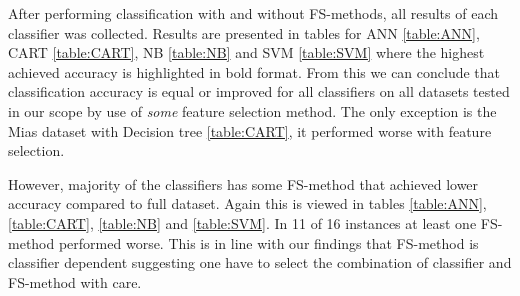After performing classification with and without FS-methods, all results of each classifier was collected. Results are presented in tables for ANN \ref{table:ANN}, CART \ref{table:CART}, NB \ref{table:NB} and SVM \ref{table:SVM} where the highest achieved accuracy is highlighted in bold format. From this we can conclude that classification accuracy is equal or improved for all classifiers on all datasets tested in our scope by use of \textit{some} feature selection method. The only exception is the Mias dataset with Decision tree \ref{table:CART}, it performed worse with feature selection.

However, majority of the classifiers has some FS-method that achieved lower accuracy compared to full dataset. Again this is viewed in tables \ref{table:ANN}, \ref{table:CART}, \ref{table:NB} and \ref{table:SVM}. In 11 of 16 instances at least one FS-method performed worse. This is in line with our findings that FS-method is classifier dependent suggesting one have to select the combination of classifier and FS-method with care.

\begin{table}[h]
  \centering
  
  \caption[]%
  {{\small Classification accuracy achieved by ANN. Accuracy improved on all datasets by the use of some feature selection method. Rows represent feature selection method, columns represent dataset, bold font indicates the highest value.}}
  \label{table:ANN}
\end{table}

\begin{table}[h]
  \centering
   \\
  \caption[]%
  {{\small All datasets except MIAS benefited in classification accuracy from feature selection using CART Decision Tree classifier. Rows represent feature selection method, columns represent dataset, bold font indicates the highest value.}}
  \label{table:CART}
\end{table}

\begin{table}[h]
  \centering
   \\
  \caption[]%
  {{\small Na\"ive Bayes sees improvement or equivalent accuracy by feature selection on every dataset. Rows represent feature selection method, columns represent dataset, bold font indicates the highest value.}}
  \label{table:NB}
\end{table}

\begin{table}[h]
  \centering
   \\
  \caption[]%
  {{\small Classification accuracy achieved by SVM. Accuracy was improved or equivalent on every dataset with use of feature selection. Rows represent feature selection method, columns represent dataset, bold font indicates the highest value.}}
  \label{table:SVM}
\end{table}

